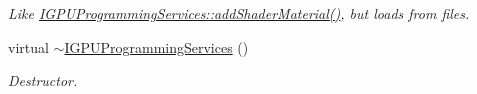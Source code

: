\begin{DoxyCompactItemize}
\begin{DoxyCompactList}\small\item\em Like \hyperlink{classirr_1_1video_1_1IGPUProgrammingServices_af7c7515773d4be33e1c66b8e3b65c293}{I\+G\+P\+U\+Programming\+Services\+::add\+Shader\+Material()}, but loads from files. \end{DoxyCompactList}\item 
\mbox{\label{classirr_1_1video_1_1IGPUProgrammingServices_a09d143ea5c55840c15ebcb84e8539bc0}} 
virtual \hyperlink{classirr_1_1video_1_1IGPUProgrammingServices_a09d143ea5c55840c15ebcb84e8539bc0}{$\sim$\+I\+G\+P\+U\+Programming\+Services} ()
\begin{DoxyCompactList}\small\item\em Destructor. \end{DoxyCompactList}\item 

\end{DoxyCompactItemize}
